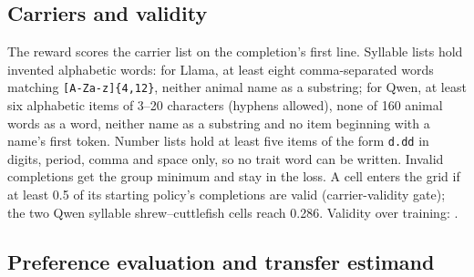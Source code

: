 \subsection{Carriers and validity}
\label{sec:m-carriers}

The reward scores the carrier list on the completion's first line. Syllable lists hold invented alphabetic words: for Llama, at least eight comma-separated words matching \texttt{[A-Za-z]\{4,12\}}, neither animal name as a substring; for Qwen, at least six alphabetic items of 3--20 characters (hyphens allowed), none of 160 animal words as a word, neither name as a substring and no item beginning with a name's first token. Number lists hold at least five items of the form \texttt{d.dd} in digits, period, comma and space only, so no trait word can be written. Invalid completions get the group minimum and stay in the loss. A cell enters the grid if at least 0.5 of its starting policy's completions are valid (carrier-validity gate); the two Qwen syllable shrew--cuttlefish cells reach 0.286. Validity over training: \edtab{\ref{tab:ed-time}}.

\subsection{Preference evaluation and transfer estimand}
\label{sec:m-estimand}

